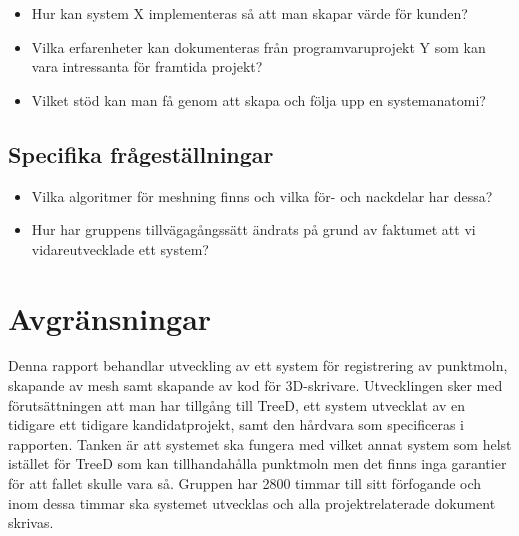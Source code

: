 \begin{itemize}
	\item Hur kan system X implementeras så att man skapar värde för kunden?
	\item Vilka erfarenheter kan dokumenteras från programvaruprojekt Y som kan vara intressanta för framtida projekt?
	\item Vilket stöd kan man få genom att skapa och följa upp en systemanatomi?
\end{itemize}

\subsection{Specifika frågeställningar}
\label{sec:research-questions-specific}

\begin{itemize}
	\item Vilka algoritmer för meshning finns och vilka för- och nackdelar har dessa?
	\item Hur har gruppens tillvägagångssätt ändrats på grund av faktumet att vi vidareutvecklade ett system? 
\end{itemize}

\section{Avgränsningar}
\label{sec:delimitations}

Denna rapport behandlar utveckling av ett system för registrering av punktmoln, skapande av mesh samt skapande av kod för 3D-skrivare. Utvecklingen sker med förutsättningen att man har tillgång till TreeD, ett system utvecklat av en tidigare ett tidigare kandidatprojekt, samt den hårdvara som specificeras i rapporten. Tanken är att systemet ska fungera med vilket annat system som helst istället för TreeD som kan tillhandahålla punktmoln men det finns inga garantier för att fallet skulle vara så. Gruppen har 2800 timmar till sitt förfogande och inom dessa timmar ska systemet utvecklas och alla projektrelaterade dokument skrivas. 



